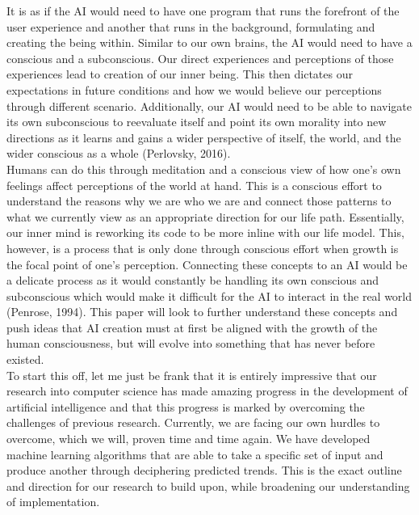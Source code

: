 \documentclass[11pt]{article}
\theoremstyle{plain}
\begin{document}
It is as if the AI would need to have one program that runs the forefront of the user experience and another that runs in the background, formulating and creating the being within. Similar to our own brains, the AI would need to have a conscious and a subconscious. Our direct experiences and perceptions of those experiences lead to creation of our inner being. This then dictates our expectations in future conditions and how we would believe our perceptions through different scenario. Additionally, our AI would need to be able to navigate its own subconscious to reevaluate itself and point its own morality into new directions as it learns and gains a wider perspective of itself, the world, and the wider conscious as a whole (Perlovsky, 2016). \\

Humans can do this through meditation and a conscious view of how one's own feelings affect perceptions of the world at hand. This is a conscious effort to understand the reasons why we are who we are and connect those patterns to what we currently view as an appropriate direction for our life path. Essentially, our inner mind is reworking its code to be more inline with our life model. This, however, is a process that is only done through conscious effort when growth is the focal point of one's perception. Connecting these concepts to an AI would be a delicate process as it would constantly be handling its own conscious and subconscious which would make it difficult for the AI to interact in the real world (Penrose, 1994). This paper will look to further understand these concepts and push ideas that AI creation must at first be aligned with the growth of the human consciousness, but will evolve into something that has never before existed. \\

To start this off, let me just be frank that it is entirely impressive that our research into computer science has made amazing progress in the development of artificial intelligence and that this progress is marked by overcoming the challenges of previous research. Currently, we are facing our own hurdles to overcome, which we will, proven time and time again. We have developed machine learning algorithms that are able to take a specific set of input and produce another through deciphering predicted trends. This is the exact outline and direction for our research to build upon, while broadening our understanding of implementation.\\
\end{document}
